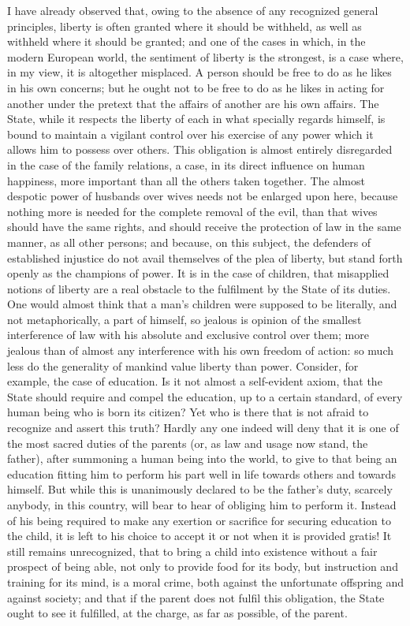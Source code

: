 \documentclass[12pt]{report}
\begin{document}
I have already observed that, owing to the absence of any recognized general principles, liberty is often granted where it should be withheld, as well as withheld where it should be granted; and one of the cases in which, in the modern European world, the sentiment of liberty is the strongest, is a case where, in my view, it is altogether misplaced. A person should be free to do as he likes in his own concerns; but he ought not to be free to do as he likes in acting for another under the pretext that the affairs of another are his own affairs. The State, while it respects the liberty of each in what specially regards himself, is bound to maintain a vigilant control over his exercise of any power which it allows him to possess over others. This obligation is almost entirely disregarded in the case of the family relations, a case, in its direct influence on human happiness, more important than all the others taken together. The almost despotic power of husbands over wives needs not be enlarged upon here, because nothing more is needed for the complete removal of the evil, than that wives should have the same rights, and should receive the protection of law in the same manner, as all other persons; and because, on this subject, the defenders of established injustice do not avail themselves of the plea of liberty, but stand forth openly as the champions of power. It is in the case of children, that misapplied notions of liberty are a real obstacle to the fulfilment by the State of its duties. One would almost think that a man's children were supposed to be literally, and not metaphorically, a part of himself, so jealous is opinion of the smallest interference of law with his absolute and exclusive control over them; more jealous than of almost any interference with his own freedom of action: so much less do the generality of mankind value liberty than power. Consider, for example, the case of education. Is it not almost a self-evident axiom, that the State should require and compel the education, up to a certain standard, of every human being who is born its citizen? Yet who is there that is not afraid to recognize and assert this truth? Hardly any one indeed will deny that it is one of the most sacred duties of the parents (or, as law and usage now stand, the father), after summoning a human being into the world, to give to that being an education fitting him to perform his part well in life towards others and towards himself. But while this is unanimously declared to be the father's duty, scarcely anybody, in this country, will bear to hear of obliging him to perform it. Instead of his being required to make any exertion or sacrifice for securing education to the child, it is left to his choice to accept it or not when it is provided gratis! It still remains unrecognized, that to bring a child into existence without a fair prospect of being able, not only to provide food for its body, but instruction and training for its mind, is a moral crime, both against the unfortunate offspring and against society; and that if the parent does not fulfil this obligation, the State ought to see it fulfilled, at the charge, as far as possible, of the parent.
\end{document}
